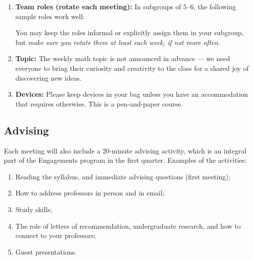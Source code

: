 \documentclass[oneside,11pt]{amsart}
\begin{document}
\begin{enumerate}[$\bullet$]
  \item \textbf{Team roles (rotate each meeting):} In subgroups of $5$--$6$, 
		the following sample roles work well:
		You may keep the roles informal or explicitly assign them in your
		subgroup, but \emph{make sure you rotate them at least each week,
		if not more often}.

	\item \textbf{Topic:}
		The weekly math topic is not announced in advance --- we
		need everyone to bring their curiosity and creativity to
		the class for a shared joy of discovering new ideas.

  \item \textbf{Devices:} Please keep devices in your bag 
		unless you have an accommodation that requires otherwise.
		This is a pen-and-paper course.
\end{enumerate}



\subsection{Advising}
Each meeting will also include a 20-minute advising activity, which is an integral part of the Engagements program in the first quarter.
Examples of the activities:
\begin{enumerate}[$\bullet$]
\item Reading the syllabus, and immediate advising questions (first meeting);
\item How to address professors in person and in email;
\item Study skills;
\item The role of letters of recommendation, undergraduate research, and how to connect to your professors;
\item Guest presentations.
\end{enumerate}
\end{document}
